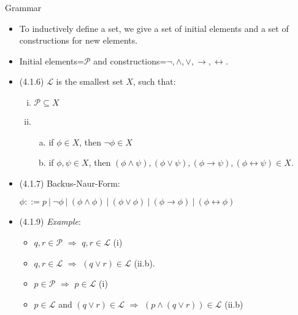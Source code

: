 \documentclass[../slides.tex]{subfiles}
\begin{document}
\begin{frame}{Grammar}
	
	\begin{itemize}
	
		 \item \alert{To inductively define a set, we give a set of initial elements and a set of constructions for new elements.}
		 
		 \item Initial elements=$\mathcal{P}$ and constructions=$\neg,\land,\lor,\to,\leftrightarrow$.

		\item (4.1.6) $\mathcal{L}$ is the smallest set $X$, such that:
		\begin{enumerate}[(i)]
		
			\item $\mathcal{P}\subseteq X$
			
			\item \begin{enumerate}[(a)]

					\item if $\phi\in X$, then $\neg \phi\in X$
					
					\item if $\phi,\psi\in X$, then $(\phi\land\psi), (\phi\lor\psi),(\phi\to\psi),(\phi\leftrightarrow\psi)\in X$.
		
				\end{enumerate}
					
		\end{enumerate}
				
		\item  (4.1.7) Backus-Naur-Form:
				
		\begin{center}
		$\phi::=p~|~\neg \phi~|~(\phi\land\phi)~|~(\phi\lor\phi)~|~(\phi\to\phi)~|~(\phi\leftrightarrow\phi)$
		\end{center}
		
		\item (4.1.9) \emph{Example}: 
			\begin{itemize}
				\item $q,r\in\mathcal{P}$ $\Rightarrow$ $q,r\in\mathcal{L}$ (i)
				
				\item $q,r\in\mathcal{L}$ $\Rightarrow$ $(q\lor r)\in\mathcal{L}$ (ii.b). 
				
				\item $p\in\mathcal{P}$ $\Rightarrow$ $p\in\mathcal{L}$ (i)
				
				\item $p\in\mathcal{L}$ and $(q\lor r)\in\mathcal{L}$ $\Rightarrow$ $(p\land (q\lor r))\in\mathcal{L}$ (ii.b)
		
			\end{itemize}
		
	\end{itemize}
		
\end{frame}
\end{document}
